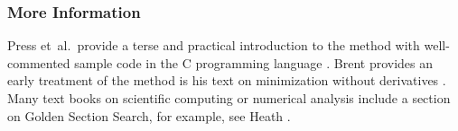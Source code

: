 \subsubsection{More Information}
Press et~al.\ provide a terse and practical introduction to the method with well-commented sample code in the C programming language \cite{Press2007}.
Brent provides an early treatment of the method is his text on minimization without derivatives \cite{Brent1973}.
Many text books on scientific computing or numerical analysis include a section on Golden Section Search, for example, see Heath \cite{Heath2002}.

